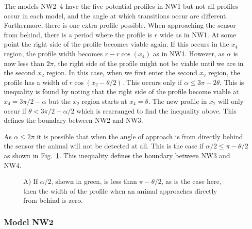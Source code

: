 The models NW2--4 have the five potential profiles in NW1 but not all profiles occur in each model, and the angle at which transitions occur are different. Furthermore, there is one extra profile possible. When approaching the sensor from behind, there is a period where the profile is $r$ wide as in NW1. At some point the right side of the profile becomes viable again. If this occurs in the $x_4$ region, the profile width becomes  $r - r\cos(x_4)$ as in NW1. However, as $\alpha$ is now less than $2\pi$, the right side of the profile might not be viable until we are in the second $x_2$ region. In this case, when we first enter the second $x_2$ region, the profile has a width of $r\cos(x_2 - \theta/2)$. This occurs only if $\alpha \le 3\pi - 2\theta$. This is inequality is found by noting that the right side of the profile become viable at $x_4 = 3\pi/2 - \alpha$ but the $x_2$ region starts at $x_4 = \theta$. The new profile in $x_2$ will only occur if  $ \theta < 3\pi/2 - \alpha/2$ which is rearranged to find the inequality above. This defines the boundary between NW2 and NW3.

As $\alpha \le 2\pi$ it is possible that when the angle of approach is from directly behind the sensor the animal will not be detected at all. This is the case if $\alpha/2\le \pi-\theta/2$ as shown in Fig.~\ref{f:NW2--4behind}. This inequality defines the boundary between NW3 and NW4.

\begin{figure}[t]
        \centering
        \begin{subfigure}[t]{0.4\textwidth}
                \centering
                \caption{}
                \label{f:NW2--4behind}
        \end{subfigure}

\caption{A) If $\alpha/2$, shown in green, is less than $\pi - \theta/2$, as is the case here, then the width of the profile when an animal approaches directly from behind is zero. }
\label{f:NW2--4}
\end{figure}


\subsubsection{Model NW2} \label{NW2}

